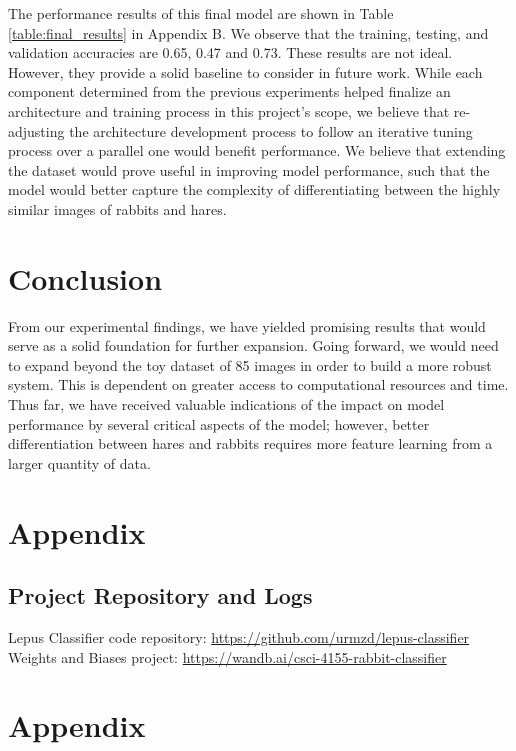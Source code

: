 \documentclass{article}
\begin{document}
The performance results of this final model are shown in Table \ref{table:final_results} in Appendix B. We observe that the training, testing, and validation accuracies are 0.65, 0.47 and 0.73. These results are not ideal. However, they provide a solid baseline to consider in future work. While each component determined from the previous experiments helped finalize an architecture and training process in this project's scope, we believe that re-adjusting the architecture development process to follow an iterative tuning process over a parallel one would benefit performance. We believe that extending the dataset would prove useful in improving model performance, such that the model would better capture the complexity of differentiating between the highly similar images of rabbits and hares. 


\section{Conclusion}

From our experimental findings, we have yielded promising results that would serve as a solid foundation for further expansion. Going forward, we would need to expand beyond the toy dataset of 85 images in order to build a more robust system. This is dependent on greater access to computational resources and time. Thus far, we have received valuable indications of the impact on model performance by several critical aspects of the model; however, better differentiation between hares and rabbits requires more feature learning from a larger quantity of data.






\medskip


\appendix

\section{Appendix}
\subsection{Project Repository and Logs}
Lepus Classifier code repository: \url{https://github.com/urmzd/lepus-classifier}
\newline
Weights and Biases project: \url{https://wandb.ai/csci-4155-rabbit-classifier}
\newline
\section{Appendix}
\end{document}
